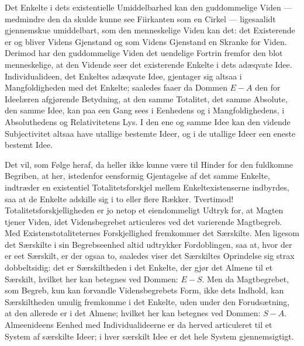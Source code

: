 \documentclass[11pt]{book}
\newcommand{\opage}[1]{\marginnote{\footnotesize\textit{[#1]}}}
\begin{document}
Det Enkelte i dets existentielle Umiddelbarhed kan den guddommelige
Viden --- medmindre den da skulde kunne see Fiirkanten som en Cirkel ---
ligesaalidt gjennemskue umiddelbart, som den menneskelige Viden kan det:
det Existerende er og bliver Videns Gjenstand og som Videns Gjenstand en
Skranke for Viden. Derimod har den guddommelige Viden det uendelige
Fortrin fremfor den blot menneskelige, at den Vidende seer det
existerende Enkelte i dets adæqvate Idee. Individualideen, det Enkeltes
adæqvate Idee, gjentager sig altsaa i Mangfoldigheden med det Enkelte;
saaledes faaer da Dommen $E - A$ den for Ideelæren afgjørende Betydning,
at den samme Totalitet, det samme Absolute, den samme Idee, kan paa een
Gang sees i Eenhedens og i Mangfoldighedens, i Absoluthedens og
Relativitetens Lys. I den ene og samme Idee kan den vidende
Subjectivitet altsaa have utallige bestemte Ideer, og i de utallige
Ideer een eneste bestemt Idee.

Det vil, som Følge heraf, da heller ikke kunne være til Hinder for den
fuldkomne Begriben, at her, istedenfor eensformig Gjentagelse af det
samme Enkelte, indtræder en existentiel Totalitetsforskjel mellem
Enkeltexistenserne indbyrdes, saa at de Enkelte adskille sig i to eller
flere Rækker. Tvertimod! Totalitetsforskjelligheden er jo netop et
eiendommeligt Udtryk for, at Magten tjener Viden, idet Vidensbegrebet
articuleres ved det varierende Magtbegreb. Med Existenstotaliteternes
Forskjellighed fremkommer det Særskilte. Men ligesom det Særskilte i sin
Begrebseenhed altid udtrykker Fordoblingen, saa at, hvor der er eet
Særskilt, er der ogsaa to, saaledes viser det Særskiltes Oprindelse sig
strax dobbeltsidig: det er Særskiltheden i det Enkelte, der gjør det
Almene til et Særskilt, hvilket her kan betegnes ved Dommen: $E - S$.
\opage{218} \setcounter{footnote}{0}%
Men da Magtbegrebet, som Begreb, kun kan forvandle Vidensbegrebets Form,
ikke dets Indhold, kan Særskiltheden umulig fremkomme i det Enkelte,
uden under den Forudsætning, at den allerede er i det Almene; hvilket her
kan betegnes ved Dommen: $S - A$. Almeenideens Eenhed med
Individualideerne er da herved articuleret til et System af særskilte
Ideer; i hver særskilt Idee er det hele System gjennemsigtigt.
\end{document}
